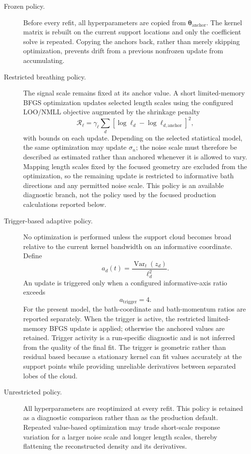 \documentclass[
  11pt,
  letterpaper,
  onehalfspacing,
  normalmargins,
  equalmargins,
  oneside
]{ut-thesis}
\begin{document}
\begin{description}
\item[Frozen policy.]
Before every refit, all hyperparameters are copied from
\(\boldsymbol\theta_{\mathrm{anchor}}\). The kernel matrix is rebuilt on the
current support locations and only the coefficient solve is repeated. Copying
the anchors back, rather than merely skipping optimization, prevents drift
from a previous nonfrozen update from accumulating.

\item[Restricted breathing policy.]
The signal scale remains fixed at its anchor value. A short limited-memory
BFGS optimization updates selected length scales using the configured
LOO/NMLL objective augmented by the shrinkage penalty
\begin{equation}
\mathcal R_{\ell}
=
\gamma_{\ell}
\sum_{d}
\left[
\log\ell_d-
\log\ell_{d,\mathrm{anchor}}
\right]^2,
\label{eq:gp-lengthscale-shrinkage}
\end{equation}
with bounds on each update. Depending on the selected statistical model, the
same optimization may update \(\sigma_n\); the noise scale must therefore be
described as estimated rather than anchored whenever it is allowed to vary.
Mapping length scales fixed by the focused geometry are excluded from the
optimization, so the remaining update is restricted to informative bath
directions and any permitted noise scale. This policy is an available
diagnostic branch, not the policy used by the focused production calculations
reported below.

\item[Trigger-based adaptive policy.]
No optimization is performed unless the support cloud becomes broad relative
to the current kernel bandwidth on an informative coordinate. Define
\begin{equation}
 a_d(t)
=
\frac{\operatorname{Var}_t(z_d)}{\ell_d^2}.
\label{eq:gp-adaptation-ratio}
\end{equation}
An update is triggered only when a configured informative-axis ratio exceeds
\begin{equation}
 a_{\mathrm{trigger}}=4.
\label{eq:gp-adaptation-threshold}
\end{equation}
For the present model, the bath-coordinate and bath-momentum ratios are
reported separately. When the trigger is active, the restricted
limited-memory BFGS update is applied; otherwise the anchored values are
retained. Trigger activity is a run-specific diagnostic and is not inferred
from the quality of the final fit.
The trigger is geometric rather than residual based because a stationary
kernel can fit values accurately at the support points while providing
unreliable derivatives between separated lobes of the cloud.

\item[Unrestricted policy.]
All hyperparameters are reoptimized at every refit. This policy is retained as
a diagnostic comparison rather than as the production default. Repeated
value-based optimization may trade short-scale response variation for a larger
noise scale and longer length scales, thereby flattening the reconstructed
density and its derivatives.
\end{description}
\end{document}

